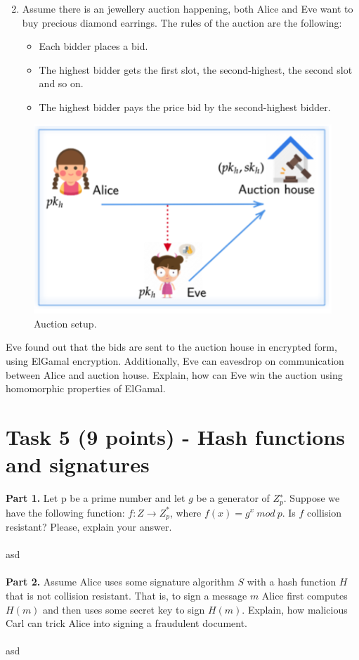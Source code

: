 \documentclass{article}
\begin{document}
\begin{enumerate}
    \setcounter{enumi}{1}
    \item Assume there is an jewellery auction happening, both Alice and Eve want to buy precious diamond earrings. 
    The rules of the auction are the following:
    \begin{itemize}
        \item Each bidder places a bid.
        \item The highest bidder gets the first slot, the second-highest, the second slot and so on.
        \item The highest bidder pays the price bid by the second-highest bidder.
    \end{itemize}
\end{enumerate}
\begin{figure}[H]
    \centering
    \label{fig:task4pic0}
    \includegraphics[scale=0.5, angle=0]{task4_pic0.png}
    \caption{Auction setup.}
\end{figure}

Eve found out that the bids are sent to the auction house in encrypted form, using ElGamal encryption. Additionally, 
Eve can eavesdrop on communication between Alice and auction house. Explain, how can Eve win the auction using homomorphic properties of ElGamal.

\section*{Task 5 (9 points) - Hash functions and signatures} %
\textbf{Part 1.} Let p be a prime number and let $g$ be a generator of $Z^{\text{∗}}_{p}$. Suppose we have the following 
function: $f : Z \rightarrow Z^{\text{*}}_{p}$, where $f(x) = g^{x}~mod~p$. Is $f$ collision resistant? Please, explain your answer.
\\ \\
asd
\\ \\
\textbf{Part 2.} Assume Alice uses some signature algorithm $S$ with a hash function $H$ that is not collision resistant. 
That is, to sign a message $m$ Alice first computes $H(m)$ and then uses some secret key to sign $H(m)$. 
Explain, how malicious Carl can trick Alice into signing a fraudulent document.
\\ \\ 
asd
\end{document}
